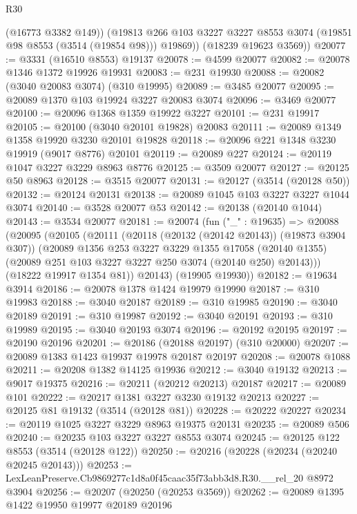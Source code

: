 \begin{lexlean}{R30}
\begin{coremodule}
          (@16773 @3382 @149))
        (@19813 @266 @103 @3227 @3227 @8553 @3074 (@19851 @98 @8553 (@3514 (@19854 @98))) @19869))
      (@18239 @19623 @3569))
@20077 := @3331 (@16510 @8553) @19137
@20078 := @4599 @20077
@20082 := @20078 @1346 @1372 @19926 @19931
@20083 := @231 @19930
@20088 := @20082 (@3040 @20083 @3074) (@310 @19995)
@20089 := @3485 @20077
@20095 := @20089 @1370 @103 @19924 @3227 @20083 @3074
@20096 := @3469 @20077
@20100 := @20096 @1368 @1359 @19922 @3227
@20101 := @231 @19917
@20105 := @20100 (@3040 @20101 @19828) @20083
@20111 := @20089 @1349 @1358 @19920 @3230 @20101 @19828
@20118 := @20096 @221 @1348 @3230 @19919 (@9017 @8776) @20101
@20119 := @20089 @227
@20124 := @20119 @1047 @3227 @3229 @8963 @8776
@20125 := @3509 @20077
@20127 := @20125 @50 @8963
@20128 := @3515 @20077
@20131 := @20127 (@3514 (@20128 @50))
@20132 := @20124 @20131
@20138 := @20089 @1045 @103 @3227 @3227 @1044 @3074
@20140 := @3528 @20077 @53
@20142 := @20138 (@20140 @1044)
@20143 := @3534 @20077
@20181 := @20074
    (fun ("_" : @19635) =>
    @20088
      (@20095
        (@20105
          (@20111
            (@20118 (@20132 (@20142 @20143)) (@19873 @3904 @307))
            (@20089
              @1356
              @253
              @3227
              @3229
              @1355
              @17058
              (@20140 @1355)
              (@20089 @251 @103 @3227 @3227 @250 @3074 (@20140 @250) @20143)))
          (@18222 @19917 @1354 @81))
        @20143)
      (@19905 @19930))
@20182 := @19634 @3914
@20186 := @20078 @1378 @1424 @19979 @19990
@20187 := @310 @19983
@20188 := @3040 @20187
@20189 := @310 @19985
@20190 := @3040 @20189
@20191 := @310 @19987
@20192 := @3040 @20191
@20193 := @310 @19989
@20195 := @3040 @20193 @3074
@20196 := @20192 @20195
@20197 := @20190 @20196
@20201 := @20186 (@20188 @20197) (@310 @20000)
@20207 := @20089 @1383 @1423 @19937 @19978 @20187 @20197
@20208 := @20078 @1088
@20211 := @20208 @1382 @14125 @19936
@20212 := @3040 @19132
@20213 := @9017 @19375
@20216 := @20211 (@20212 @20213) @20187
@20217 := @20089 @101
@20222 := @20217 @1381 @3227 @3230 @19132 @20213
@20227 := @20125 @81 @19132 (@3514 (@20128 @81))
@20228 := @20222 @20227
@20234 := @20119 @1025 @3227 @3229 @8963 @19375 @20131
@20235 := @20089 @506
@20240 := @20235 @103 @3227 @3227 @8553 @3074
@20245 := @20125 @122 @8553 (@3514 (@20128 @122))
@20250 := @20216 (@20228 (@20234 (@20240 @20245 @20143)))
@20253 := LexLeanPreserve.Cb9869277c1d8a0f45caac35f73abb3d8.R30.__rel_20 @8972 @3904
@20256 := @20207 (@20250 (@20253 @3569))
@20262 := @20089 @1395 @1422 @19950 @19977 @20189 @20196

\end{coremodule}
\end{lexlean}
